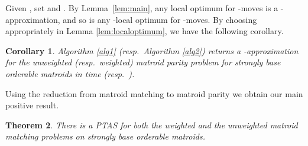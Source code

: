 \documentclass[letterpaper,11pt]{article}
\newtheorem{theorem}{Theorem}[section]
\newtheorem{corollary}[theorem]{Corollary}
\theoremstyle{definition}
\begin{document}
Given , set  and . By Lemma~\ref{lem:main}, any local optimum for -moves is a -approximation, and so is any -local optimum for -moves. By choosing  appropriately in Lemma \ref{lem:localoptimum}, we have the following corollary.

\begin{corollary} Algorithm \ref{alg1} (resp.\ Algorithm \ref{alg2}) returns a -approximation for the unweighted (resp.\ weighted) matroid parity problem for strongly base orderable matroids in time  (resp.\ ).
\end{corollary}

Using the reduction from matroid matching to matroid parity we obtain our main positive result.
\begin{theorem} There is a PTAS for both the weighted and the unweighted matroid matching problems on strongly base orderable matroids.
\end{theorem}
\end{document}
